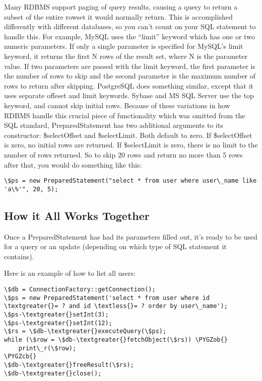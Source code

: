 \documentclass[letterpaper,10pt,english]{sphinxmanual}
\def\PYGZob{\char`\{}
\def\PYGZcb{\char`\}}
\begin{document}
Many RDBMS support paging of query results, causing a query to return a subset of the entire rowset
it would normally return.  This is accomplished differently with different databases, so you can't
count on your SQL statement to handle this.  For example, MySQL uses the ``limit'' keyword which has
one or two numeric parameters.  If only a single parameter is specified for MySQL's limit keyword,
it returns the first N rows of the result set, where N is the parameter value.  If two parameters
are passed with the limit keyword, the first parameter is the number of rows to skip and the second
parameter is the maximum number of rows to return after skipping.  PostgreSQL does something
similar, except that it uses separate offeset and limit keywords.  Sybase and MS SQL Server use the
top keyword, and cannot skip initial rows.  Because of these variations in how RDBMS handle this
crucial piece of functionality which was omitted from the SQL standard, PreparedStatement has two
additional arguments to its constructor: \$selectOffset and \$selectLimit.  Both default to zero.  If
\$selectOffset is zero, no initial rows are returned.  If \$selectLimit is zero, there is no limit to
the number of rows returned.  So to skip 20 rows and return no more than 5 rows after that, you
would do something like this:

\begin{Verbatim}[commandchars=\\\{\}]
\$ps = new PreparedStatement("select * from user where user\_name like 'a\%'", 20, 5);
\end{Verbatim}


\subsection{How it All Works Together}
\label{jaxFrameworkGuide:how-it-all-works-together}
Once a PreparedStatement has had its parameters filled out, it's ready to be used for a query or an
update (depending on which type of SQL statement it contains).

Here is an example of how to list all users:

\begin{Verbatim}[commandchars=\\\{\}]
\$db = ConnectionFactory::getConnection();
\$ps = new PreparedStatement('select * from user where id \textgreater{}= ? and id \textless{}= ? order by user\_name');
\$ps-\textgreater{}setInt(3);
\$ps-\textgreater{}setInt(12);
\$rs = \$db-\textgreater{}executeQuery(\$ps);
while (\$row = \$db-\textgreater{}fetchObject(\$rs)) \PYGZob{}
    print\_r(\$row);
\PYGZcb{}
\$db-\textgreater{}freeResult(\$rs);
\$db-\textgreater{}close();
\end{Verbatim}
\end{document}
